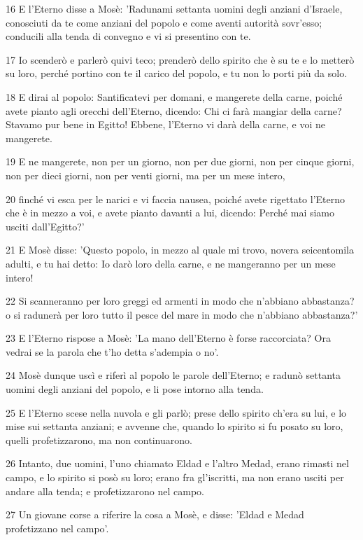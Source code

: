 \par 16 E l'Eterno disse a Mosè: 'Radunami settanta uomini degli anziani d'Israele, conosciuti da te come anziani del popolo e come aventi autorità sovr'esso; conducili alla tenda di convegno e vi si presentino con te.
\par 17 Io scenderò e parlerò quivi teco; prenderò dello spirito che è su te e lo metterò su loro, perché portino con te il carico del popolo, e tu non lo porti più da solo.
\par 18 E dirai al popolo: Santificatevi per domani, e mangerete della carne, poiché avete pianto agli orecchi dell'Eterno, dicendo: Chi ci farà mangiar della carne? Stavamo pur bene in Egitto! Ebbene, l'Eterno vi darà della carne, e voi ne mangerete.
\par 19 E ne mangerete, non per un giorno, non per due giorni, non per cinque giorni, non per dieci giorni, non per venti giorni, ma per un mese intero,
\par 20 finché vi esca per le narici e vi faccia nausea, poiché avete rigettato l'Eterno che è in mezzo a voi, e avete pianto davanti a lui, dicendo: Perché mai siamo usciti dall'Egitto?'
\par 21 E Mosè disse: 'Questo popolo, in mezzo al quale mi trovo, novera seicentomila adulti, e tu hai detto: Io darò loro della carne, e ne mangeranno per un mese intero!
\par 22 Si scanneranno per loro greggi ed armenti in modo che n'abbiano abbastanza? o si radunerà per loro tutto il pesce del mare in modo che n'abbiano abbastanza?'
\par 23 E l'Eterno rispose a Mosè: 'La mano dell'Eterno è forse raccorciata? Ora vedrai se la parola che t'ho detta s'adempia o no'.
\par 24 Mosè dunque uscì e riferì al popolo le parole dell'Eterno; e radunò settanta uomini degli anziani del popolo, e li pose intorno alla tenda.
\par 25 E l'Eterno scese nella nuvola e gli parlò; prese dello spirito ch'era su lui, e lo mise sui settanta anziani; e avvenne che, quando lo spirito si fu posato su loro, quelli profetizzarono, ma non continuarono.
\par 26 Intanto, due uomini, l'uno chiamato Eldad e l'altro Medad, erano rimasti nel campo, e lo spirito si posò su loro; erano fra gl'iscritti, ma non erano usciti per andare alla tenda; e profetizzarono nel campo.
\par 27 Un giovane corse a riferire la cosa a Mosè, e disse: 'Eldad e Medad profetizzano nel campo'.
